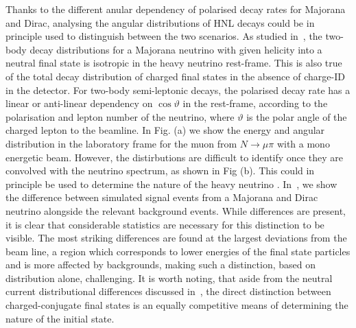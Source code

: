 Thanks to the different anular dependency of polarised decay rates for Majorana and Dirac, analysing the angular distributions of %
HNL decays could be in principle used to distinguish between the two scenarios.
As studied in~, the two-body decay distributions for a Majorana neutrino %
with given helicity into a neutral final state is isotropic in the heavy neutrino rest-frame.
This is also true of the total decay distribution of charged final states in the absence of charge-ID in the detector.
For two-body semi-leptonic decays, the polarised decay rate has a linear or anti-linear dependency on $\cos\vartheta$ in the rest-frame, %
according to the polarisation and lepton number of the neutrino, where $\vartheta$ is the polar angle of the charged lepton to the beamline.
In Fig. (a) we show the energy and angular distribution in the laboratory frame for the muon from $N \to \mu \pi$ with a mono energetic beam.
However, the distirbutions are difficult to identify once they are convolved with the neutrino spectrum, as shown in Fig (b).
This could in principle be used to determine the nature of the heavy neutrino \cite{Balantekin:2018ukw}.
In~, we show the difference between simulated signal events from a Majorana and Dirac neutrino %
alongside the relevant background events. 
While differences are present, it is clear that considerable statistics are necessary for this distinction to be visible.
The most striking differences are found at the largest deviations from the beam line, a region which corresponds %
to lower energies of the final state particles and is more affected by backgrounds, %
making such a distinction, based on distribution alone, challenging.
It is worth noting, that aside from the neutral current distributional differences discussed in~, %
the direct distinction between charged-conjugate final states is an equally competitive means of determining the nature of the initial state.


